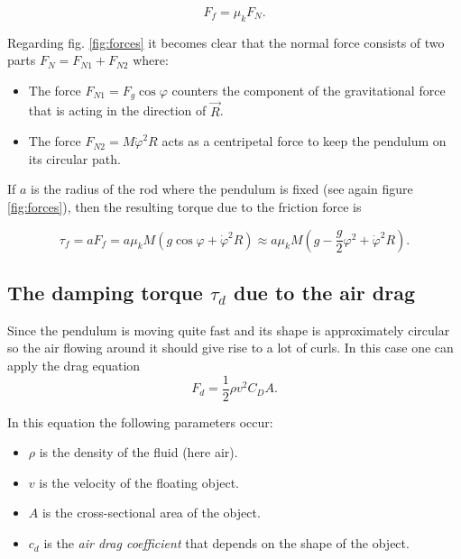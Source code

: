 \begin{equation}
F_f=\mu_k F_N.
\end{equation}

Regarding fig. \ref{fig:forces} it becomes clear that the normal force consists of two parts $F_N=F_{N1}+F_{N2}$ where:

\begin{itemize}
\item The force $F_{N1} = F_g \cos \varphi $  counters the component of the gravitational force that is acting in the direction of $\vec{R}$.
\item The force $F_{N2} = M \dot{\varphi}^2 R$  acts as a centripetal force to keep the pendulum on its circular path. \cite{centripetalforce}
\end{itemize}

If $a$ is the radius of the rod where the pendulum is fixed (see again figure \ref{fig:forces}), then the resulting torque due to the friction force is

\begin{equation}\label{eq:tauf}
\tau_f = a F_f = a \mu_k M \left(g \cos \varphi + \dot{\varphi}^2 R\right) \approx a \mu_k M \left(g - \frac{g}{2} \varphi^2  + \dot{\varphi}^2 R\right).
\end{equation}





\subsection{The damping torque $\tau_d$ due to the air drag}

Since the pendulum is moving quite fast and its shape is approximately circular so the air flowing around it should give rise to a lot of curls. In this case one can apply the drag equation \cite{airdrag} 
\begin{equation}\label{eq:coulomb}
F_d=\frac{1}{2} \rho v^2 C_D A.
\end{equation}

In this equation the following parameters occur:

\begin{itemize}
\item $\rho$ is the density of the fluid (here air).
\item $v$ is the velocity of the floating object.
\item $A$ is the cross-sectional area of the object.
\item $c_d$ is the \emph{air drag coefficient} that depends on the shape of the object.
\end{itemize}

